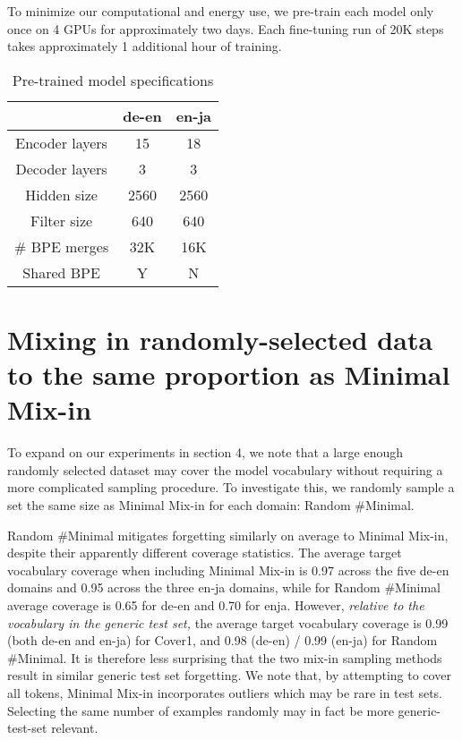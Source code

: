 \documentclass[11pt]{article}
\begin{document}
To minimize our computational and energy use, we pre-train each model only once on 4 GPUs for approximately two days. Each fine-tuning run of 20K steps takes approximately 1 additional hour of training.

\begin{table}[h]
    \centering
    \small
    \begin{tabular}{c|cc}
         & de-en &en-ja \\
         \hline
    Encoder layers  & 15 & 18\\
    Decoder layers  & 3 & 3 \\
    Hidden size     & 2560 &2560 \\
    Filter size     & 640 &640 \\
    \# BPE merges     & 32K  & 16K \\
    Shared BPE & Y & N\\
    \end{tabular}
    \caption{Pre-trained model specifications}
    \label{tab:modelspecs}
\end{table}

\section{Mixing in randomly-selected data to the same proportion as Minimal Mix-in}
\label{appendix-setup}
To expand on our experiments in section 4, we note that a large enough randomly selected dataset may cover the model vocabulary without requiring a more complicated sampling procedure. To investigate this, we randomly sample a set the same size as Minimal Mix-in for each domain: Random \#Minimal. 

Random \#Minimal mitigates forgetting similarly on average to Minimal Mix-in, despite their apparently different coverage statistics. The average target vocabulary coverage when including Minimal Mix-in is 0.97 across the five de-en domains and 0.95 across the three en-ja domains, while for Random \#Minimal average coverage is 0.65 for de-en and 0.70 for enja.  However, \emph{relative to the vocabulary in the generic test set,} the average target vocabulary coverage is 0.99 (both de-en and en-ja) for  Cover1,  and 0.98 (de-en) / 0.99 (en-ja) for Random \#Minimal. It is therefore less surprising that the two mix-in sampling methods result in similar generic test set forgetting. We note that, by attempting to cover all tokens, Minimal Mix-in incorporates outliers which may be rare in test sets. Selecting the same number of examples randomly may in fact be more generic-test-set relevant. 
\end{document}
